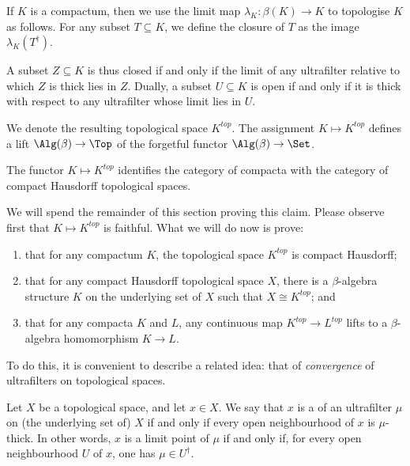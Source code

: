 \begin{construction} \label{turnacompactumintoatopspace}
	If $K$ is a compactum, then we use the limit map $ \lambda_K \colon \beta(K) \to K $ to topologise $ K $ as follows.
	For any subset $ T \subseteq K $, we define the closure of $ T $ as the image $ \lambda_K(T^{\dag}) $.

	A subset $ Z \subseteq K $ is thus closed if and only if the limit of any ultrafilter relative to which $ Z $ is thick lies in $ Z $.
	Dually, a subset $ U \subseteq K $ is open if and only if it is thick with respect to any ultrafilter whose limit lies in $ U $.

	We denote the resulting topological space $ K^{\textit{top}} $.
	The assignment $ K \mapsto K^{\textit{top}} $ defines a lift $ \Alg(\beta) \to \Top $ of the forgetful functor $ \Alg(\beta) \to \Set $.
\end{construction}

\begin{proposition} \label{compactaarecompacta}
	The functor $ K \mapsto K^{\textit{top}} $ identifies the category of compacta with the category of compact Hausdorff topological spaces. 
\end{proposition}

We will spend the remainder of this section proving this claim.
Please observe first that $ K \mapsto K^{\textit{top}} $ is faithful.
What we will do now is prove:
\begin{enumerate}
	\item that for any compactum $ K $, the topological space $ K^{\textit{top}} $ is compact Hausdorff;
	\item that for any compact Hausdorff topological space $ X $, there is a $ \beta $-algebra structure $ K $ on the underlying set of $ X $ such that $ X \cong K^{\textit{top}} $; and
	\item that for any compacta $ K $ and $ L $, any continuous map $ K^{\textit{top}} \to L^{\textit{top}} $ lifts to a $ \beta $-algebra homomorphism $ K \to L$.
\end{enumerate}
To do this, it is convenient to describe a related idea: that of \emph{convergence} of ultrafilters on topological spaces.

\begin{definition} \label{limitpointofultrafilter}
	Let $ X $ be a topological space, and let $ x \in X $.
	We say that $ x $ is a  of an ultrafilter $ \mu $ on (the underlying set of) $ X $ if and only if every open neighbourhood of $ x $ is $ \mu $-thick.
	In other words, $ x $ is a limit point of $ \mu $ if and only if, for every open neighbourhood $ U $ of $ x $, one has $ \mu \in U^{\dag} $.
\end{definition}

